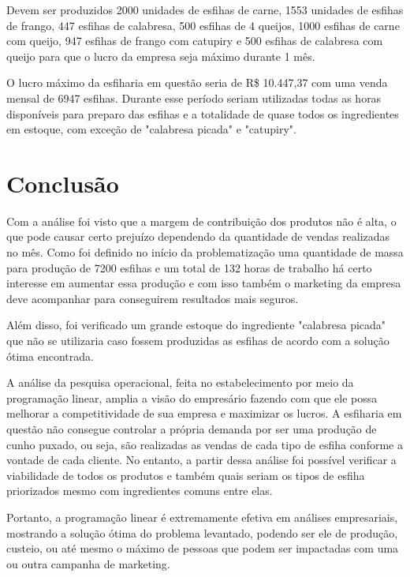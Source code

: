 \documentclass[
	12pt,				%
	openright,			%
	oneside,			%
	a4paper,			%
	english,			%
	french,				%
	spanish,			%
	brazil				%
	]{abntex2}
\begin{document}
Devem ser produzidos 2000 unidades de esfihas de carne, 1553 unidades de esfihas de frango, 447 esfihas de calabresa, 500 esfihas de 4 queijos, 1000 esfihas de carne com queijo, 947 esfihas de frango com catupiry e 500 esfihas de calabresa com queijo para que o lucro da empresa seja máximo durante 1 mês.

O lucro máximo da esfiharia em questão seria de R\$  10.447,37 com uma venda mensal de 6947 esfihas. Durante esse período seriam utilizadas todas as horas disponíveis para preparo das esfihas e a totalidade de quase todos os ingredientes em estoque, com exceção de "calabresa picada" e "catupiry".



\chapter{Conclusão}

Com a análise foi visto que a margem de contribuição dos produtos não é alta, o que pode causar certo prejuízo dependendo da quantidade de vendas realizadas no mês. Como foi definido no início da problematização uma quantidade de massa para produção de 7200 esfihas e um total de 132 horas de trabalho há certo interesse em aumentar essa produção e com isso também o marketing da empresa deve acompanhar para conseguirem resultados mais seguros. 

Além disso, foi verificado um grande estoque do ingrediente "calabresa picada" que não se utilizaria caso fossem produzidas as esfihas de acordo com a solução ótima encontrada.

A análise da pesquisa operacional, feita no estabelecimento por meio da programação linear, amplia a visão do empresário fazendo com que ele possa melhorar a competitividade de sua empresa e maximizar os lucros. A esfiharia em questão não consegue controlar a própria demanda por ser uma produção de cunho puxado, ou seja, são realizadas as vendas de cada tipo de esfiha conforme a vontade de cada cliente. No entanto, a partir dessa análise foi possível verificar a viabilidade de todos os produtos e também quais seriam os tipos de esfiha priorizados mesmo com ingredientes comuns entre elas.

Portanto, a programação linear é extremamente efetiva em análises empresariais, mostrando a solução ótima do problema levantado, podendo ser ele de produção, custeio, ou até mesmo o máximo de pessoas que podem ser impactadas com uma ou outra campanha de marketing.



\end{document}

